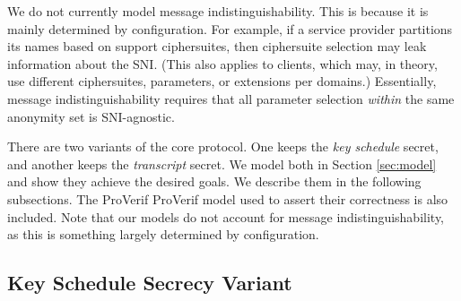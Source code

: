 \documentclass{article}
\theoremstyle{definition}
\theoremstyle{definition}
\begin{document}
We do not currently model message indistinguishability. This is because it is mainly determined by configuration.
For example, if a service provider partitions its names based on support ciphersuites, then ciphersuite
selection may leak information about the SNI. (This also applies to clients, which may, in theory, use different
ciphersuites, parameters, or extensions per domains.) Essentially, message indistinguishability requires that
all parameter selection \emph{within} the same anonymity set is SNI-agnostic.

There are two variants of the core protocol. One keeps the \emph{key schedule} secret, and another
keeps the \emph{transcript} secret. We model both in Section \ref{sec:model} and show they achieve
the desired goals. We describe them in the following subsections. The ProVerif ProVerif \cite{blanchet2016modeling} 
model used to assert their correctness is also included. Note that our models do not account for message 
indistinguishability, as this is something largely determined by configuration. 

\subsection{Key Schedule Secrecy Variant}
\end{document}
